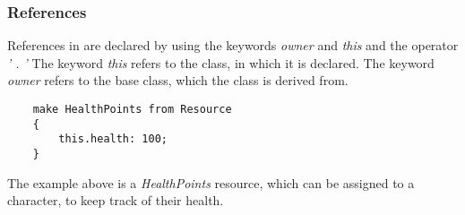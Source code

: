 \subsubsection*{References}
References in \langname{} are declared by using the keywords \emph{owner} and \emph{this} and the operator \emph{' . '} The keyword \emph{this} refers to the class, in which it is declared. The keyword \emph{owner} refers to the base class, which the class is derived from. 
\begin{lstlisting}
	make HealthPoints from Resource
	{
		this.health: 100;
	}
\end{lstlisting}
The example above is a \emph{HealthPoints} resource, which can be assigned to a character, to keep track of their health.